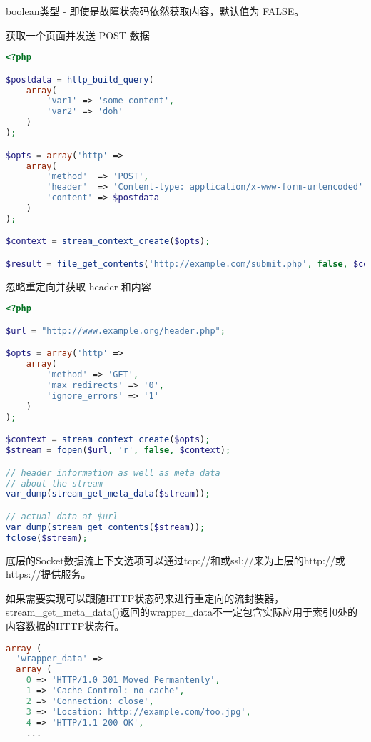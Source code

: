 boolean类型 - 即使是故障状态码依然获取内容，默认值为 FALSE。

\begin{example}
获取一个页面并发送 POST 数据
\begin{lstlisting}[language=PHP]
<?php

$postdata = http_build_query(
    array(
        'var1' => 'some content',
        'var2' => 'doh'
    )
);

$opts = array('http' =>
    array(
        'method'  => 'POST',
        'header'  => 'Content-type: application/x-www-form-urlencoded',
        'content' => $postdata
    )
);

$context = stream_context_create($opts);

$result = file_get_contents('http://example.com/submit.php', false, $context);
\end{lstlisting}
\end{example}

\begin{example}
忽略重定向并获取 header 和内容
\begin{lstlisting}[language=PHP]
<?php

$url = "http://www.example.org/header.php";

$opts = array('http' =>
    array(
        'method' => 'GET',
        'max_redirects' => '0',
        'ignore_errors' => '1'
    )
);

$context = stream_context_create($opts);
$stream = fopen($url, 'r', false, $context);

// header information as well as meta data
// about the stream
var_dump(stream_get_meta_data($stream));

// actual data at $url
var_dump(stream_get_contents($stream));
fclose($stream);
\end{lstlisting}
\end{example}

底层的Socket数据流上下文选项可以通过tcp://和或ssl://来为上层的http://或https://提供服务。

如果需要实现可以跟随HTTP状态码来进行重定向的流封装器，stream\_get\_meta\_data()返回的wrapper\_data不一定包含实际应用于索引0处的内容数据的HTTP状态行。


\begin{lstlisting}[language=PHP]
array (
  'wrapper_data' =>
  array (
    0 => 'HTTP/1.0 301 Moved Permantenly',
    1 => 'Cache-Control: no-cache',
    2 => 'Connection: close',
    3 => 'Location: http://example.com/foo.jpg',
    4 => 'HTTP/1.1 200 OK',
    ...
\end{lstlisting}

